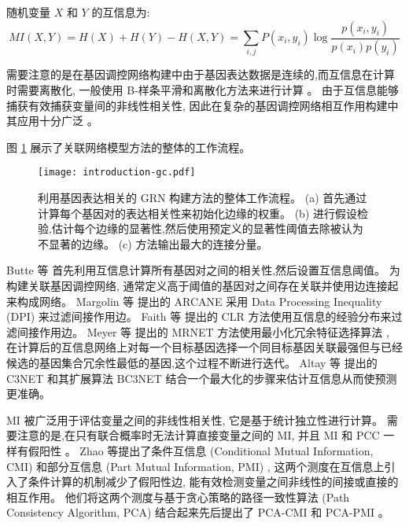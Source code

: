 随机变量 $X$ 和 $Y$ 的互信息为:
\begin{equation}
    MI(X,Y) = H(X) + H(Y) - H(X,Y) = \sum\limits_{i,j} {P(x_i ,y_i )\log \frac{{p(x_i,y_i )}}{{p(x_i )p(y_i )}}} 
\end{equation}

需要注意的是在基因调控网络构建中由于基因表达数据是连续的,而互信息在计算时需要离散化,
一般使用 B-样条平滑和离散化方法来进行计算 。
由于互信息能够捕获有效捕获变量间的非线性相关性,
因此在复杂的基因调控网络相互作用构建中其应用十分广泛 。

图 \ref{fig:pre-gc} 展示了关联网络模型方法的整体的工作流程。
\begin{figure}[!htbp]
    \centering
    \texttt{[image: introduction-gc.pdf]}
    \caption{
        利用基因表达相关的 GRN 构建方法的整体工作流程。
        (a) 首先通过计算每个基因对的表达相关性来初始化边缘的权重。
        (b) 进行假设检验,估计每个边缘的显著性,然后使用预定义的显著性阈值去除被认为不显著的边缘。
        (c) 方法输出最大的连接分量。
    }
    \label{fig:pre-gc}
\end{figure}


Butte 等  首先利用互信息计算所有基因对之间的相关性,然后设置互信息阈值。
为构建关联基因调控网络, 通常定义高于阈值的基因对之间存在关联并使用边连接起来构成网络。
Margolin 等  提出的 ARCANE 采用 Data Processing Inequality (DPI) 来过滤间接作用边。
Faith 等  提出的 CLR 方法使用互信息的经验分布来过滤间接作用边。
Meyer 等  提出的 MRNET 方法使用最小化冗余特征选择算法 ,
在计算后的互信息网络上对每一个目标基因选择一个同目标基因关联最强但与已经候选的基因集合冗余性最低的基因,这个过程不断进行迭代。
Altay 等  提出的 C3NET 和其扩展算法 BC3NET  结合一个最大化的步骤来估计互信息从而使预测更准确。

MI 被广泛用于评估变量之间的非线性相关性,
它是基于统计独立性进行计算。
需要注意的是,在只有联合概率时无法计算直接变量之间的 MI,
并且 MI 和 PCC 一样有假阳性 。
Zhao 等提出了条件互信息 (Conditional Mutual Information, CMI)  和部分互信息 (Part Mutual Information, PMI) ,
这两个测度在互信息上引入了条件计算的机制减少了假阳性边,
能有效检测变量之间非线性的间接或直接的相互作用。
他们将这两个测度与基于贪心策略的路径一致性算法 (Path Consistency Algorithm, PCA) 结合起来先后提出了 PCA-CMI  和 PCA-PMI 。

